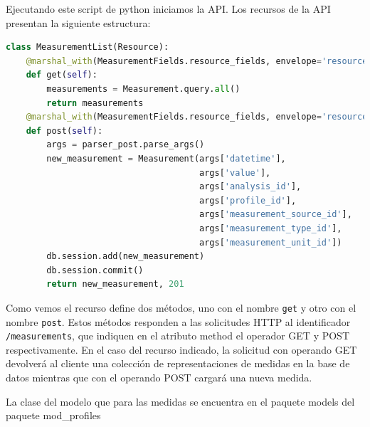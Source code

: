 Ejecutando este script de python iniciamos la API.
Los recursos de la API presentan la siguiente estructura:

\begin{lstlisting}[language=Python]
class MeasurementList(Resource):
    @marshal_with(MeasurementFields.resource_fields, envelope='resource')
    def get(self):
        measurements = Measurement.query.all()
        return measurements
    @marshal_with(MeasurementFields.resource_fields, envelope='resource')
    def post(self):
        args = parser_post.parse_args()
        new_measurement = Measurement(args['datetime'],
                                      args['value'],
                                      args['analysis_id'],
                                      args['profile_id'],
                                      args['measurement_source_id'],
                                      args['measurement_type_id'],
                                      args['measurement_unit_id'])
        db.session.add(new_measurement)
        db.session.commit()
        return new_measurement, 201
\end{lstlisting}

Como vemos el recurso define dos métodos, uno con el nombre \texttt{get} y otro con el nombre \texttt{post}.
Estos métodos responden a las solicitudes HTTP al identificador \texttt{/measurements}, que indiquen en el atributo method el operador GET y POST respectivamente. En el caso del recurso indicado, la solicitud con operando GET devolverá al cliente una colección de representaciones de medidas en la base de datos mientras que con el operando POST cargará una nueva medida.

La clase del modelo que para las medidas se encuentra en el paquete models del paquete mod\_profiles

